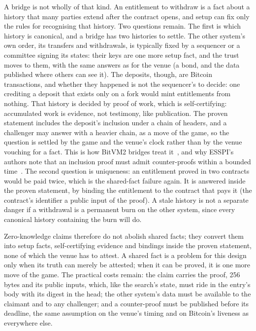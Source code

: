 \documentclass[11pt]{article}
\begin{document}
A bridge is not wholly of that kind. An entitlement to withdraw is a
fact about a history that many parties extend after the contract opens,
and setup can fix only the rules for recognising that history. Two
questions remain. The first is which history is canonical, and a bridge
has two histories to settle. The other system's own order, its
transfers and withdrawals, is typically fixed by a sequencer or a
committee signing its states: their keys are one more setup fact, and
the trust moves to them, with the same answers as for the venue (a
bond, and the data published where others can see it). The deposits,
though, are Bitcoin transactions, and whether they happened is not the
sequencer's to decide: one crediting a deposit that exists only on a
fork would mint entitlements from nothing. That history is decided by
proof of work, which is self-certifying: accumulated work is evidence,
not testimony, like publication. The proven statement includes the
deposit's inclusion under a chain of headers, and a challenger may
answer with a heavier chain, as a move of the game, so the question is
settled by the game and the venue's clock rather than by the venue
vouching for a fact. This is how BitVM2 bridges treat it~\cite{bitvm2},
and why ESSPI's authors note that an inclusion proof must admit
counter-proofs within a bounded time~\cite{esspi}. The second question
is uniqueness: an entitlement proved in two contracts would be paid
twice, which is the shared-fact failure again. It is answered inside
the proven statement, by binding the entitlement to the contract that
pays it (the contract's identifier a public input of the proof). A
stale history is not a separate danger if a withdrawal is a permanent
burn on the other system, since every canonical history containing the
burn will do.

Zero-knowledge claims therefore do not abolish shared facts; they
convert them into setup facts, self-certifying evidence and bindings
inside the proven statement, none of which the venue has to attest. A
shared fact is a problem for this design only when its truth can merely
be attested; when it can be proved, it is one more move of the game.
The practical costs remain: the claim carries the proof, 256 bytes and
its public inputs, which, like the search's state, must ride in the
entry's body with its digest in the head; the
other system's data must be available to the claimant and to any
challenger; and a counter-proof must be published before its deadline,
the same assumption on the venue's timing and on Bitcoin's liveness as
everywhere else.
\end{document}
